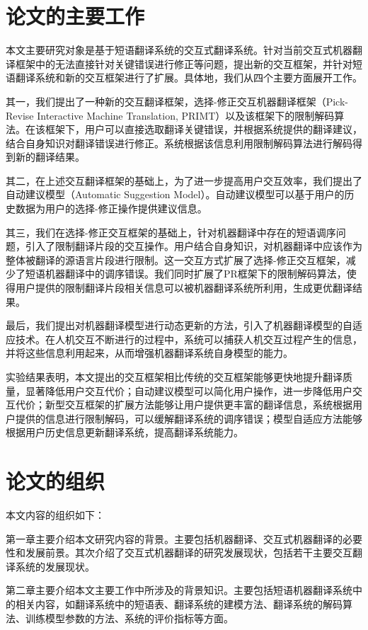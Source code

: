\documentclass[master, winfont]{njuthesis}
\begin{document}
\section{论文的主要工作}
本文主要研究对象是基于短语翻译系统的交互式翻译系统。针对当前交互式机器翻译框架中的无法直接针对关键错误进行修正等问题，提出新的交互框架，并针对短语翻译系统和新的交互框架进行了扩展。具体地，我们从四个主要方面展开工作。

其一，我们提出了一种新的交互翻译框架，选择-修正交互机器翻译框架（Pick-Revise Interactive Machine Translation, PRIMT）以及该框架下的限制解码算法。在该框架下，用户可以直接选取翻译关键错误，并根据系统提供的翻译建议，结合自身知识对翻译错误进行修正。系统根据该信息利用限制解码算法进行解码得到新的翻译结果。

其二，在上述交互翻译框架的基础上，为了进一步提高用户交互效率，我们提出了自动建议模型（Automatic Suggestion Model）。自动建议模型可以基于用户的历史数据为用户的选择-修正操作提供建议信息。

其三，我们在选择-修正交互框架的基础上，针对机器翻译中存在的短语调序问题，引入了限制翻译片段的交互操作。用户结合自身知识，对机器翻译中应该作为整体被翻译的源语言片段进行限制。这一交互方式扩展了选择-修正交互框架，减少了短语机器翻译中的调序错误。我们同时扩展了PR框架下的限制解码算法，使得用户提供的限制翻译片段相关信息可以被机器翻译系统所利用，生成更优翻译结果。

最后，我们提出对机器翻译模型进行动态更新的方法，引入了机器翻译模型的自适应技术。在人机交互不断进行的过程中，系统可以捕获人机交互过程产生的信息，并将这些信息利用起来，从而增强机器翻译系统自身模型的能力。

实验结果表明，本文提出的交互框架相比传统的交互框架能够更快地提升翻译质量，显著降低用户交互代价；自动建议模型可以简化用户操作，进一步降低用户交互代价；新型交互框架的扩展方法能够让用户提供更丰富的翻译信息，系统根据用户提供的信息进行限制解码，可以缓解翻译系统的调序错误；模型自适应方法能够根据用户历史信息更新翻译系统，提高翻译系统能力。

\section{论文的组织}
本文内容的组织如下：

第一章主要介绍本文研究内容的背景。主要包括机器翻译、交互式机器翻译的必要性和发展前景。其次介绍了交互式机器翻译的研究发展现状，包括若干主要交互翻译系统的发展现状。

第二章主要介绍本文主要工作中所涉及的背景知识。主要包括短语机器翻译系统中的相关内容，如翻译系统中的短语表、翻译系统的建模方法、翻译系统的解码算法、训练模型参数的方法、系统的评价指标等方面。
\end{document}

